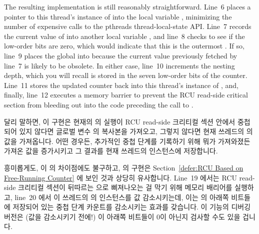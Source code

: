 The resulting  implementation is still reasonably
straightforward.
Line~6 places a pointer to this thread's instance of 
into the local variable , minimizing the number of expensive
calls to the pthreads thread-local-state API.
Line~7 records the current value of  into another
local variable , and line~8 checks to see if the low-order
bits are zero, which would indicate that this is the outermost
.
If so, line~9 places the global  into  because
the current value previously fetched by line~7 is likely to be obsolete.
In either case, line~10 increments the nesting depth, which you will
recall is stored in the seven low-order bits of the counter.
Line~11 stores the updated counter back into this thread's instance
of , and, finally, line~12 executes a memory
barrier to prevent the RCU read-side critical section from bleeding out
into the code preceding the call to .
\fi

달리 말하면, 이  구현은 현재의  의
실행이 RCU read-side 크리티컬 섹션 안에서 중첩되어 있지 않다면 글로벌 변수
 의 복사본을 가져오고, 그렇지 않다면 현재 쓰레드의
 의 값을 가져옵니다.
어떤 경우든, 추가적인 중첩 단계를 기록하기 위해 뭐가 가져와졌든 가져온 값을
증가시키고 그 결과를 현재 쓰레드의  인스턴스에 저장합니다.
\iffalse

In other words, this implementation of \co{rcu_read_lock()} picks up a copy
of the global \co{rcu_gp_ctr} unless the current invocation of
\co{rcu_read_lock()} is nested within an RCU read-side critical section,
in which case it instead fetches the contents of the current thread's
instance of \co{rcu_reader_gp}.
Either way, it increments whatever value it fetched in order to record
an additional nesting level, and stores the result in the current
thread's instance of \co{rcu_reader_gp}.
\fi

흥미롭게도, 이  의 차이점에도 불구하고,
 의 구현은
Section~\ref{defer:RCU Based on Free-Running Counter} 에 보인 것과 상당히
유사합니다.
Line~19 에서는 RCU read-side 크리티컬 섹션이 뒤따르는 
으로 삐져나오는 걸 막기 위해 메모리 배리어를 실행하고, line~20 에서 이 쓰레드의
 의 인스턴스를 값 감소시키는데, 이는  의
아래쪽 비트들에 저장되어 있는 중첩 단계 카운트를 감소시키는 효과를 갖습니다.
이 기능의 디버깅 버전은 (값을 감소시키기 전에!) 이 아래쪽 비트들이 0이 아닌지
검사할 수도 있을 겁니다.
\iffalse

